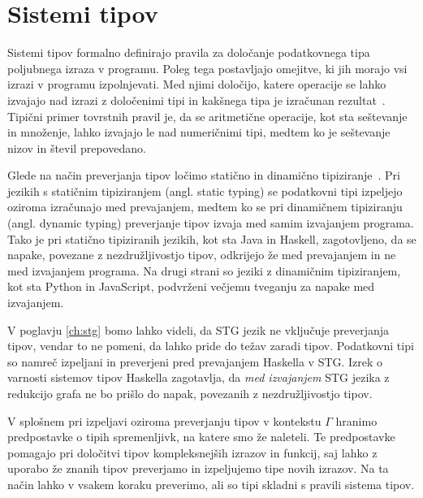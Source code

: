 \section{Sistemi tipov}
\label{sec:sistemi-tipov}

Sistemi tipov formalno definirajo pravila za določanje podatkovnega tipa poljubnega izraza v programu. Poleg tega postavljajo omejitve, ki jih morajo vsi izrazi v programu izpolnjevati. Med njimi določijo, katere operacije se lahko izvajajo nad izrazi z določenimi tipi in kakšnega tipa je izračunan rezultat~\cite{pierce2002types}. Tipični primer tovrstnih pravil je, da se aritmetične operacije, kot sta seštevanje in množenje, lahko izvajajo le nad numeričnimi tipi, medtem ko je seštevanje nizov in števil prepovedano.

Glede na način preverjanja tipov ločimo statično in dinamično tipiziranje~\cite{pierce2002types}. Pri jezikih s statičnim tipiziranjem (angl. static typing) se podatkovni tipi izpeljejo oziroma izračunajo med prevajanjem, medtem ko se pri dinamičnem tipiziranju (angl. dynamic typing) preverjanje tipov izvaja med samim izvajanjem programa. Tako je pri statično tipiziranih jezikih, kot sta Java in Haskell, zagotovljeno, da se napake, povezane z nezdružljivostjo tipov, odkrijejo že med prevajanjem in ne med izvajanjem programa. Na drugi strani so jeziki z dinamičnim tipiziranjem, kot sta Python in JavaScript, podvrženi večjemu tveganju za napake med izvajanjem.

V poglavju \ref{ch:stg} bomo lahko videli, da STG jezik ne vključuje preverjanja tipov, vendar to ne pomeni, da lahko pride do težav zaradi tipov. Podatkovni tipi so namreč izpeljani in preverjeni pred prevajanjem Haskella v STG. Izrek o varnosti sistemov tipov Haskella zagotavlja, da \textit{med izvajanjem} STG jezika z redukcijo grafa ne bo prišlo do napak, povezanih z nezdružljivostjo tipov.

V splošnem pri izpeljavi oziroma preverjanju tipov v kontekstu $\Gamma$ hranimo predpostavke o tipih spremenljivk, na katere smo že naleteli. Te predpostavke pomagajo pri določitvi tipov kompleksnejših izrazov in funkcij, saj lahko z uporabo že znanih tipov preverjamo in izpeljujemo tipe novih izrazov. Na ta način lahko v vsakem koraku preverimo, ali so tipi skladni s pravili sistema tipov.

